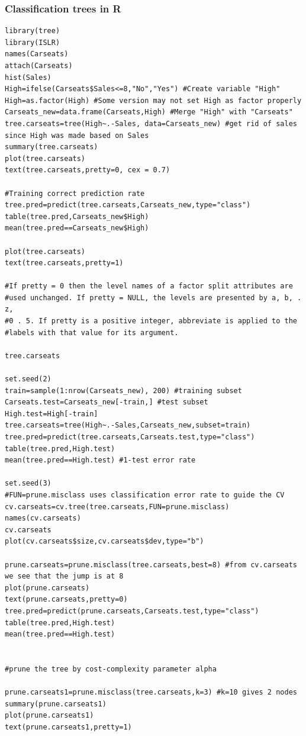 \documentclass{article}
\begin{document}
\subsubsection{Classification trees in R}
\begin{lstlisting}
library(tree)
library(ISLR)
names(Carseats)
attach(Carseats)
hist(Sales)
High=ifelse(Carseats$Sales<=8,"No","Yes") #Create variable "High"
High=as.factor(High) #Some version may not set High as factor properly
Carseats_new=data.frame(Carseats,High) #Merge "High" with "Carseats"
tree.carseats=tree(High~.-Sales, data=Carseats_new) #get rid of sales since High was made based on Sales
summary(tree.carseats)
plot(tree.carseats)
text(tree.carseats,pretty=0, cex = 0.7)

#Training correct prediction rate
tree.pred=predict(tree.carseats,Carseats_new,type="class")
table(tree.pred,Carseats_new$High)
mean(tree.pred==Carseats_new$High)

plot(tree.carseats)
text(tree.carseats,pretty=1)

#If pretty = 0 then the level names of a factor split attributes are 
#used unchanged. If pretty = NULL, the levels are presented by a, b, . z, 
#0 . 5. If pretty is a positive integer, abbreviate is applied to the 
#labels with that value for its argument.

tree.carseats

set.seed(2)
train=sample(1:nrow(Carseats_new), 200) #training subset
Carseats.test=Carseats_new[-train,] #test subset
High.test=High[-train]
tree.carseats=tree(High~.-Sales,Carseats_new,subset=train)
tree.pred=predict(tree.carseats,Carseats.test,type="class")
table(tree.pred,High.test)
mean(tree.pred==High.test) #1-test error rate

set.seed(3)
#FUN=prune.misclass uses classification error rate to guide the CV
cv.carseats=cv.tree(tree.carseats,FUN=prune.misclass)
names(cv.carseats)
cv.carseats
plot(cv.carseats$size,cv.carseats$dev,type="b")

prune.carseats=prune.misclass(tree.carseats,best=8) #from cv.carseats we see that the jump is at 8
plot(prune.carseats)
text(prune.carseats,pretty=0)
tree.pred=predict(prune.carseats,Carseats.test,type="class")
table(tree.pred,High.test)
mean(tree.pred==High.test)


#prune the tree by cost-complexity parameter alpha

prune.carseats1=prune.misclass(tree.carseats,k=3) #k=10 gives 2 nodes
summary(prune.carseats1)
plot(prune.carseats1)
text(prune.carseats1,pretty=1)
\end{lstlisting}
\end{document}
